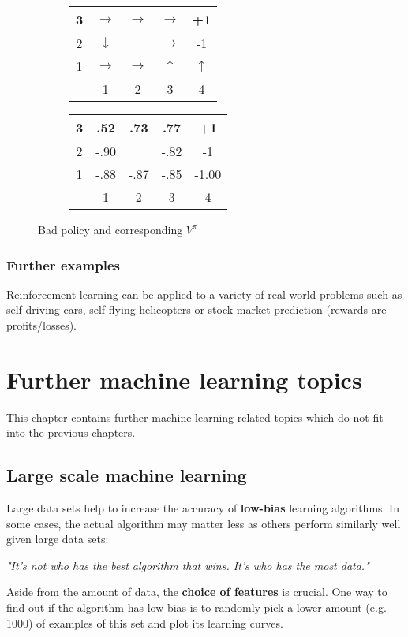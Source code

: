 \documentclass{report}
\begin{document}
\begin{figure}[h!]
\centering
\begin{subfigure}[b]{0.4\textwidth}
\begin{tabular}{c|c|c|c|c|}
\hline
3 & $\rightarrow$ & $\rightarrow$ & $\rightarrow$ & +1 \\
\hline
2 & $\downarrow$ & \cellcolor{black} & $\rightarrow$ & -1 \\
\hline
1 & $\rightarrow$ & $\rightarrow$ & $\uparrow$ & $\uparrow$ \\
\hline
& 1 & 2 & 3 & 4 \\
\end{tabular}
\end{subfigure}
\begin{subfigure}[b]{0.4\textwidth}
\begin{tabular}{c|c|c|c|c|}
\hline
3 & .52 & .73 & .77 & +1 \\
\hline
2 & -.90 &\cellcolor{black} & -.82 & -1 \\
\hline
1 & -.88 & -.87 & -.85 & -1.00 \\
\hline
& 1 & 2 & 3 & 4 \\
\end{tabular}
\end{subfigure}
\caption{Bad policy and corresponding $V^{\pi}$}
\label{ref:sampleworldoptimalpolicy1}
\end{figure}

\subsection{Further examples}
Reinforcement learning can be applied to a variety of real-world problems such as self-driving cars, self-flying helicopters or stock market prediction (rewards are profits/losses).


\chapter{Further machine learning topics}
This chapter contains further machine learning-related topics which do not fit into the previous chapters.

\section{Large scale machine learning}
Large data sets  help to increase the accuracy of {\bf low-bias} learning algorithms. In some cases, the actual algorithm may matter less as others perform similarly well given large data sets:
\begin{center}
\em{"It's not who has the best algorithm that wins. It's who has the most data."}
\end{center}
Aside from the amount of data, the {\bf choice of features} is crucial.
One way to find out if the algorithm has low bias is to randomly pick a lower amount (e.g. 1000) of  examples of this set and plot its learning curves.
\end{document}
